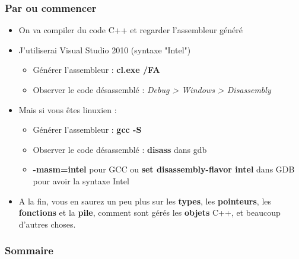 \documentclass{beamer}
\begin{document}
\begin{frame}
    \frametitle{Par ou commencer}
\begin{itemize}
 \item On va compiler du code C++ et regarder l'assembleur généré 
 \item J'utiliserai Visual Studio 2010 (syntaxe "Intel")
        \begin{itemize}
         \item Générer l'assembleur : \textbf{cl.exe /FA}
         \item Observer le code désassemblé : \textit{Debug > Windows > Disassembly}  
        \end{itemize}
        \pause
 \item Mais si vous êtes linuxien :
        \begin{itemize}
         \item Générer l'assembleur : \textbf{gcc -S}
         \item Observer le code désassemblé : \textbf{disass} dans gdb
         \item \textbf{-masm=intel} pour GCC ou \textbf{set disassembly-flavor intel} dans GDB pour avoir la syntaxe Intel  
        \end{itemize}
\pause
\item A la fin, vous en saurez un peu plus sur les \textbf{types}, les \textbf{pointeurs}, les \textbf{fonctions} et la \textbf{pile}, comment sont gérés les \textbf{objets} C++, et beaucoup d'autres choses.
\end{itemize}
\end{frame}
\begin{frame}
    \frametitle{Sommaire}
    \tiny{\tableofcontents}
\end{frame}
\end{document}
